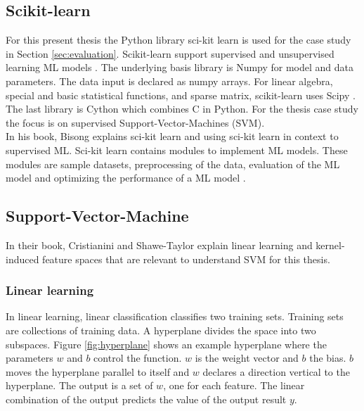 \subsection{Scikit-learn}

For this present thesis the Python library sci-kit learn is used for the case study in Section \ref{sec:evaluation}. Scikit-learn support supervised and unsupervised learning ML models \cite{scikit-learn}. The underlying basis library is Numpy for model and data parameters. The data input is declared as numpy arrays. \cite{harris2020array} For linear algebra, special and basic statistical functions, and sparse matrix, scikit-learn uses Scipy \cite{2020SciPy-NMeth}. The last library is Cython \cite{behnel2011cython} which combines C in Python. For the thesis case study the focus is on supervised Support-Vector-Machines (SVM). \\
In his book, Bisong \cite{Bisong_2019} explains sci-kit learn and using sci-kit learn in context to supervised ML. Sci-kit learn contains modules to implement ML models. These modules are sample datasets, preprocessing of the data, evaluation of the ML model and optimizing the performance of a ML model \cite{sklearn_api}.

\subsection{Support-Vector-Machine}

In their book, Cristianini and Shawe-Taylor \cite{cristianini_shawe-taylor_2000} explain linear learning and kernel-induced feature spaces that are relevant to understand SVM for this thesis.

\subsubsection*{Linear learning}

In linear learning, linear classification classifies two training sets. Training sets are collections of training data. A hyperplane divides the space into two subspaces.
\cite{cristianini_shawe-taylor_2000} Figure \ref{fig:hyperplane} shows an example hyperplane where the parameters $w$ and $b$ control the function. $w$ is the weight vector and $b$ the
bias. $b$ moves the hyperplane parallel to itself and $w$ declares a direction vertical to the hyperplane. The output is a set of $w$, one for each feature. The linear combination of the
output predicts the value of the output result $y$.

